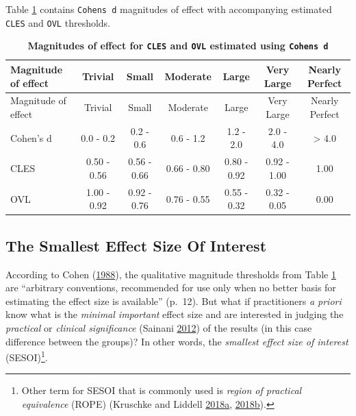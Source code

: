 \documentclass[
]{book}
\begin{document}
Table \ref{tab:magnitudes-of-effect-CLES-OVL} contains \texttt{Cohen\textquotesingle{}s\ d} magnitudes of effect with accompanying estimated \texttt{CLES} and \texttt{OVL} thresholds.

\begin{longtable}[]{@{}lcccccc@{}}
\caption{\label{tab:magnitudes-of-effect-CLES-OVL} \textbf{Magnitudes of effect for \texttt{CLES} and \texttt{OVL} estimated using \texttt{Cohen\textquotesingle{}s\ d}}}\tabularnewline
\toprule
Magnitude of effect & Trivial & Small & Moderate & Large & Very Large & Nearly Perfect\tabularnewline
\midrule
\endfirsthead
\toprule
Magnitude of effect & Trivial & Small & Moderate & Large & Very Large & Nearly Perfect\tabularnewline
\midrule
\endhead
Cohen's d & 0.0 - 0.2 & 0.2 - 0.6 & 0.6 - 1.2 & 1.2 - 2.0 & 2.0 - 4.0 & \textgreater{} 4.0\tabularnewline
CLES & 0.50 - 0.56 & 0.56 - 0.66 & 0.66 - 0.80 & 0.80 - 0.92 & 0.92 - 1.00 & 1.00\tabularnewline
OVL & 1.00 - 0.92 & 0.92 - 0.76 & 0.76 - 0.55 & 0.55 - 0.32 & 0.32 - 0.05 & 0.00\tabularnewline
\bottomrule
\end{longtable}

\bigskip

\hypertarget{the-smallest-effect-size-of-interest}{%
\subsection{The Smallest Effect Size Of Interest}\label{the-smallest-effect-size-of-interest}}

According to Cohen (\protect\hyperlink{ref-cohenStatisticalPowerAnalysis1988}{1988}), the qualitative magnitude thresholds from Table \ref{tab:magnitudes-of-effect-CLES-OVL} are ``arbitrary conventions, recommended for use only when no better basis for estimating the effect size is available'' (p.~12). But what if practitioners \emph{a priori} know what is the \emph{minimal important} effect size and are interested in judging the \emph{practical} or \emph{clinical significance} (Sainani \protect\hyperlink{ref-sainaniClinicalStatisticalSignificance2012}{2012}) of the results (in this case difference between the groups)? In other words, the \emph{smallest effect size of interest} (SESOI)\footnote{Other term for SESOI that is commonly used is \emph{region of practical equivalence} (ROPE) (Kruschke and Liddell \protect\hyperlink{ref-kruschkeBayesianDataAnalysis2018}{2018}\protect\hyperlink{ref-kruschkeBayesianDataAnalysis2018}{a}, \protect\hyperlink{ref-kruschkeBayesianNewStatistics2018}{2018}\protect\hyperlink{ref-kruschkeBayesianNewStatistics2018}{b}).}.
\end{document}
